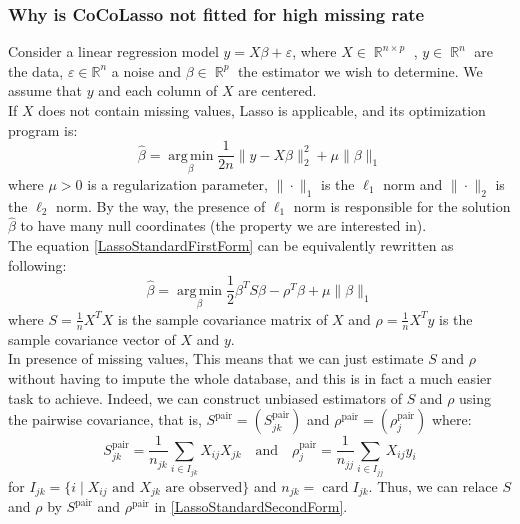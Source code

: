 \documentclass[]{article}
\DeclareMathOperator*{\argmin}{arg\,min}
\DeclareMathOperator*{\card}{\mathrm{card}}
\DeclareMathOperator*{\R}{\mathbb{R}}
\begin{document}
\subsubsection{Why is CoCoLasso not fitted for high missing rate}
Consider a linear regression model $y = X\beta + \varepsilon$, where $X\in \R^{n\times p}$ , $y\in \R^n$ are the data, $\varepsilon\in \mathbb{R}^n$ a noise and $\beta\in \R^p$ the estimator we wish to determine. We assume that $y$ and each column of $X$ are centered.\\
If $X$ does not contain missing values, Lasso is applicable, and its optimization program is:
\begin{equation}
	\label{LassoStandardFirstForm}
	\hat{\beta} = \argmin\limits_{\beta} \frac{1}{2n}\|y - X\beta\|_2^2 + \mu \|\beta\|_1
\end{equation}
where $\mu > 0$ is a regularization parameter, $\|\cdot\|_1$ is the $\ell_1$ norm and $\|\cdot\|_2$ is the $\ell_2$ norm.
By the way, the presence of $\ell_1$ norm is responsible for the solution $\hat{\beta}$ to have many null coordinates (the property we are interested in).\\
The equation \eqref{LassoStandardFirstForm} can be equivalently rewritten as following:
\begin{equation}
	\label{LassoStandardSecondForm}
	\hat{\beta} = \argmin\limits_{\beta} \frac{1}{2}\beta^T S\beta - \rho^T\beta + \mu \|\beta\|_1
\end{equation}
where $S=\frac{1}{n}X^TX$ is the sample covariance matrix of $X$ and $\rho = \frac{1}{n}X^Ty$ is the sample covariance vector of $X$ and $y$.\\
In presence of missing values, This means that we can just estimate $S$ and $\rho$ without having to impute the whole database, and this is in fact a much easier task to achieve. Indeed,  we can construct unbiased estimators of $S$ and $\rho$ using the pairwise covariance, that is, $S^{\text{pair}} = (S^{\text{pair}}_{jk})$ and $\rho^{\text{pair}} = (\rho^{\text{pair}}_{j})$ where:
\begin{equation}
	S^{\text{pair}}_{jk} = \frac{1}{n_{jk}} \sum_{i \in I_{jk}} X_{ij}X_{jk} \quad \text{and}\quad \rho^{\text{pair}}_{j} = \frac{1}{n_{jj}} \sum_{i \in I_{jj}} X_{ij}y_i
\end{equation}
for $I_{jk} = \{i\mid \text{$X_{ij}$ and $X_{jk}$ are observed}\}$ and $n_{jk} = \card I_{jk}$. Thus, we can relace $S$ and $\rho$ by $S^{\text{pair}}$ and $\rho^{\text{pair}}$ in \eqref{LassoStandardSecondForm}.\\
\end{document}
